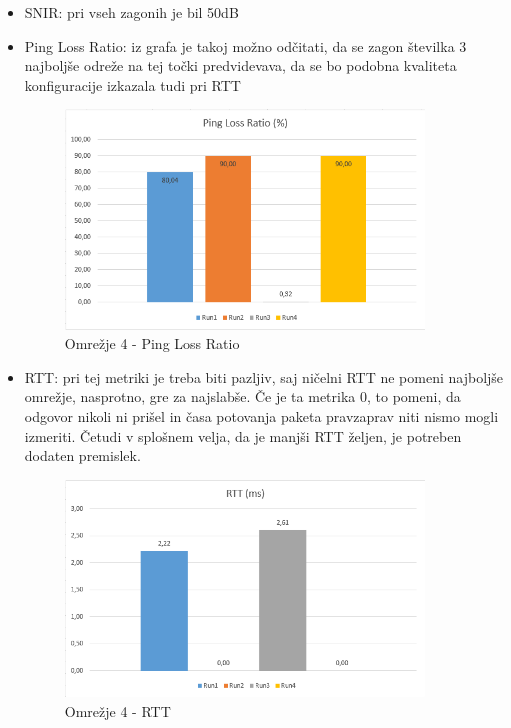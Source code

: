\documentclass[11pt,a4paper,slovene]{myarticle}
\begin{document}
\begin{itemize}
	\item SNIR: pri vseh zagonih je bil 50dB
	\item Ping Loss Ratio:
		\subitem iz grafa je takoj možno odčitati, da se zagon številka 3 najboljše odreže
		\subitem na tej točki predvidevava, da se bo podobna kvaliteta konfiguracije izkazala tudi pri RTT
		\begin{figure}[h!]
			\centering
				\includegraphics[width=0.9\textwidth, keepaspectratio=true]{./images/om4-ping-mean.png}
			\caption{Omrežje 4 - Ping Loss Ratio}
			\label{fig:om4pinglossratio}
		\end{figure}
	\item RTT:
		\subitem pri tej metriki je treba biti pazljiv, saj ničelni RTT ne pomeni najboljše omrežje, nasprotno, gre za najslabše. Če je ta metrika 0, to pomeni, da odgovor nikoli ni prišel in časa potovanja paketa pravzaprav niti nismo mogli izmeriti. Četudi v splošnem velja, da je manjši RTT željen, je potreben dodaten premislek.
		\begin{figure}[h!]
			\centering
				\includegraphics[width=0.9\textwidth, keepaspectratio=true]{./images/om4-rtt-mean.png}
			\caption{Omrežje 4 - RTT}
			\label{fig:om4rtt}
		\end{figure}
\end{itemize}
\end{document}
